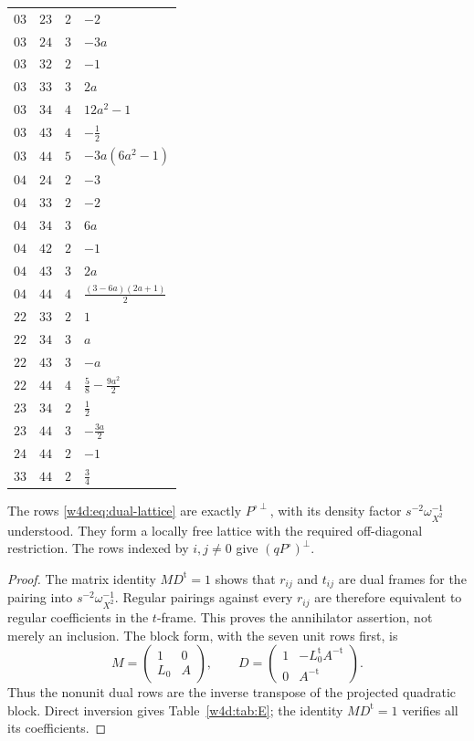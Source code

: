 \begin{longtable}{@{}ccc>{\raggedright\arraybackslash}p{}@{}}
$03$ & $23$ & $2$ & $-2$ \\
$03$ & $24$ & $3$ & $- 3 a$ \\
$03$ & $32$ & $2$ & $-1$ \\
$03$ & $33$ & $3$ & $2 a$ \\
$03$ & $34$ & $4$ & $12 a^{2} - 1$ \\
$03$ & $43$ & $4$ & $- \frac{1}{2}$ \\
$03$ & $44$ & $5$ & $- 3 a \left(6 a^{2} - 1\right)$ \\
$04$ & $24$ & $2$ & $-3$ \\
$04$ & $33$ & $2$ & $-2$ \\
$04$ & $34$ & $3$ & $6 a$ \\
$04$ & $42$ & $2$ & $-1$ \\
$04$ & $43$ & $3$ & $2 a$ \\
$04$ & $44$ & $4$ & $\frac{\left(3 - 6 a\right) \left(2 a + 1\right)}{2}$ \\
$22$ & $33$ & $2$ & $1$ \\
$22$ & $34$ & $3$ & $a$ \\
$22$ & $43$ & $3$ & $- a$ \\
$22$ & $44$ & $4$ & $\frac{5}{8} - \frac{9 a^{2}}{2}$ \\
$23$ & $34$ & $2$ & $\frac{1}{2}$ \\
$23$ & $44$ & $3$ & $- \frac{3 a}{2}$ \\
$24$ & $44$ & $2$ & $-1$ \\
$33$ & $44$ & $2$ & $\frac{3}{4}$ \\
\end{longtable}\endgroup


\begin{proposition}\label{w4d:prop:annihilator}
The rows \eqref{w4d:eq:dual-lattice} are exactly $P^{\circ\perp}$, with its density factor $s^{-2}\omega_{X^2}^{-1}$ understood. They form a locally free lattice with the required off-diagonal restriction. The rows indexed by $i,j\ne0$ give $(qP^\circ)^\perp$.
\end{proposition}
\begin{proof}
The matrix identity $MD^{\mathrm t}=1$ shows that $r_{ij}$ and $t_{ij}$ are dual frames for the pairing into $s^{-2}\omega_{X^2}^{-1}$. Regular pairings against every $r_{ij}$ are therefore equivalent to regular coefficients in the $t$-frame. This proves the annihilator assertion, not merely an inclusion. The block form, with the seven unit rows first, is
\[
 M=\begin{pmatrix}1&0\\ L_0&A\end{pmatrix},\qquad
 D=\begin{pmatrix}1&-L_0^{\mathrm t}A^{-\mathrm t}\\0&A^{-\mathrm t}\end{pmatrix}.
\]
Thus the nonunit dual rows are the inverse transpose of the projected quadratic block. Direct inversion gives Table~\ref{w4d:tab:E}; the identity $MD^{\mathrm t}=1$ verifies all its coefficients.
\end{proof}

